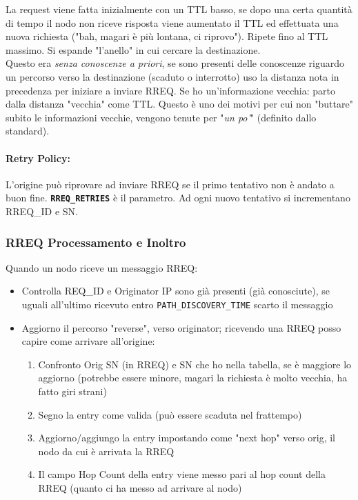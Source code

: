 La request viene fatta inizialmente con un TTL basso, se dopo una certa quantità di tempo il nodo non riceve risposta viene aumentato il TTL ed effettuata una nuova richiesta ("bah, magari è più lontana, ci riprovo"). Ripete fino al TTL massimo. Si espande "l'anello" in cui cercare la destinazione.\\

Questo era \textit{senza conoscenze a priori}, se sono presenti delle conoscenze riguardo un percorso verso la destinazione (scaduto o interrotto) uso la distanza nota in precedenza per iniziare a inviare RREQ. Se ho un'informazione vecchia: parto dalla distanza "vecchia" come TTL. Questo è uno dei motivi per cui non "buttare" subito le informazioni vecchie, vengono tenute per "\textit{un po'}" (definito dallo standard).\\

\paragraph{Retry Policy:} L'origine può riprovare ad inviare RREQ se il primo tentativo non è andato a buon fine. \texttt{\textbf{RREQ\_RETRIES}} è il parametro. Ad ogni nuovo tentativo si incrementano RREQ\_ID e SN.\\

\subsubsection{RREQ Processamento e Inoltro}

Quando un nodo riceve un messaggio RREQ:
\begin{itemize}
	\item Controlla REQ\_ID e Originator IP sono già presenti (già conosciute), se uguali all'ultimo ricevuto entro \texttt{PATH\_DISCOVERY\_TIME} scarto il messaggio
	\item Aggiorno il percorso "reverse", verso originator; ricevendo una RREQ posso capire come arrivare all'origine:
	\begin{enumerate}
		\item Confronto Orig SN (in RREQ) e SN che ho nella tabella, se è maggiore lo aggiorno (potrebbe essere minore, magari la richiesta è molto vecchia, ha fatto giri strani)
		\item Segno la entry come valida (può essere scaduta nel frattempo)
		\item Aggiorno/aggiungo la entry impostando come "next hop" verso orig, il nodo da cui è arrivata la RREQ
		\item Il campo Hop Count della entry viene messo pari al hop count della RREQ (quanto ci ha messo ad arrivare al nodo)
	\end{enumerate}
\end{itemize}


